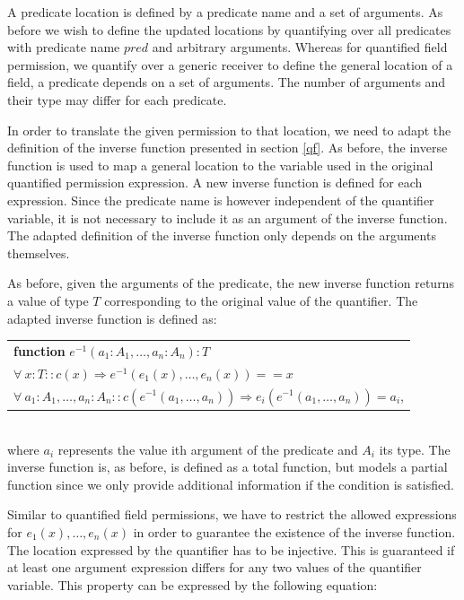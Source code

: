 \documentclass[12pt]{article}
\begin{document}
A predicate location is defined by a predicate name and a set of arguments. As before we wish to define the updated locations by quantifying over all predicates with predicate name \(pred\) and arbitrary arguments. Whereas for quantified field permission, we quantify over a generic receiver to define the general location of a field, a predicate depends on a set of arguments. The number of arguments and their type may differ for each predicate.

In order to translate the given permission to that location, we need to adapt the definition of the inverse function presented in section \ref{qf}. As before, the inverse function is used to map a general location to the variable used in the original quantified permission expression. A new inverse function is defined for each expression. Since the predicate name is however independent of the quantifier variable, it is not necessary to include it as an argument of the inverse function. The adapted definition of the inverse function only depends on the arguments themselves.

As before, given the arguments of the predicate, the new inverse function returns a value of type \(T\) corresponding to the original value of the quantifier. The adapted inverse function is defined as:\\

\begin{tabularx}{1\textwidth}{ X}
\textbf{function }\(e^{-1}(a_1:A_1, \dots, a_n:A_n): T\) \\
\(\forall \ x:T :: c(x) \Rightarrow e^{-1}(e_1 (x),\dots,e_n (x))==x \) \\
\( \forall \ a_1:A_1,\dots, a_n:A_n ::  c(e^{-1}(a_1, \dots,a_n )) \Rightarrow e_i (e^{-1}(a_1,\dots, a_n )) = a_i \),\\
\end{tabularx}\\
where \(a_i\) represents the value ith argument of the predicate and \(A_i\) its type. The inverse function is, as before, is defined as a total function, but models a partial function since we only provide additional information if the condition is satisfied.

Similar to quantified field permissions, we have to restrict the allowed expressions for \(e_1(x), \dots, e_n(x)\) in order to guarantee the existence of the inverse function. The location expressed by the quantifier has to be injective. This is guaranteed if at least one argument expression differs for any two values of the quantifier variable. This property can be expressed by the following equation:\\
\end{document}
